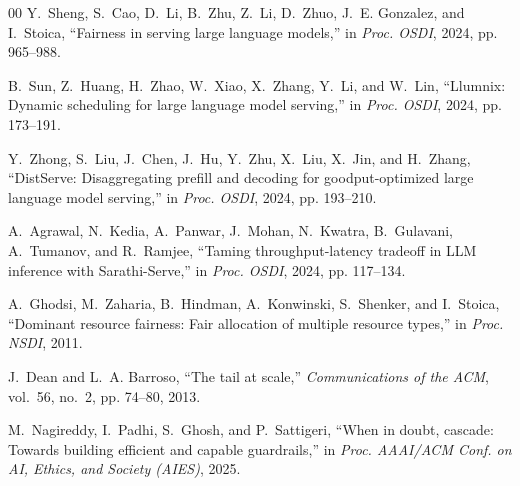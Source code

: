 \documentclass[conference]{IEEEtran}
\begin{document}
\begin{thebibliography}{00}
Y.~Sheng, S.~Cao, D.~Li, B.~Zhu, Z.~Li, D.~Zhuo, J.~E. Gonzalez, and I.~Stoica, ``Fairness in serving large language models,'' in \emph{Proc. OSDI}, 2024, pp. 965--988.

B.~Sun, Z.~Huang, H.~Zhao, W.~Xiao, X.~Zhang, Y.~Li, and W.~Lin, ``Llumnix: Dynamic scheduling for large language model serving,'' in \emph{Proc. OSDI}, 2024, pp. 173--191.

Y.~Zhong, S.~Liu, J.~Chen, J.~Hu, Y.~Zhu, X.~Liu, X.~Jin, and H.~Zhang, ``DistServe: Disaggregating prefill and decoding for goodput-optimized large language model serving,'' in \emph{Proc. OSDI}, 2024, pp. 193--210.

A.~Agrawal, N.~Kedia, A.~Panwar, J.~Mohan, N.~Kwatra, B.~Gulavani, A.~Tumanov, and R.~Ramjee, ``Taming throughput-latency tradeoff in LLM inference with Sarathi-Serve,'' in \emph{Proc. OSDI}, 2024, pp. 117--134.

A.~Ghodsi, M.~Zaharia, B.~Hindman, A.~Konwinski, S.~Shenker, and I.~Stoica, ``Dominant resource fairness: Fair allocation of multiple resource types,'' in \emph{Proc. NSDI}, 2011.

J.~Dean and L.~A. Barroso, ``The tail at scale,'' \emph{Communications of the ACM}, vol.~56, no.~2, pp. 74--80, 2013.

M.~Nagireddy, I.~Padhi, S.~Ghosh, and P.~Sattigeri, ``When in doubt, cascade: Towards building efficient and capable guardrails,'' in \emph{Proc. AAAI/ACM Conf. on AI, Ethics, and Society (AIES)}, 2025.

\end{thebibliography}
\end{document}
